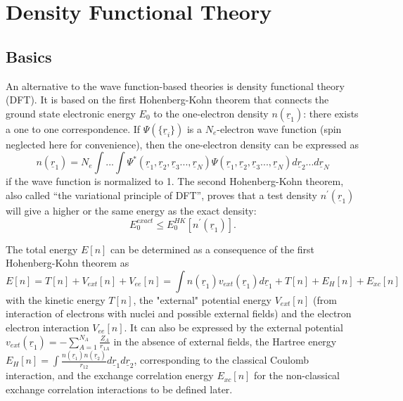 \documentclass[11pt,DIV=13,BCOR=5mm,a4paper,headinclude]{scrbook}
\renewcommand{\vec}[1]{\underline{#1}}
\begin{document}
\section{Density Functional Theory}
\subsection{Basics}
An alternative to the wave function-based theories is density functional theory (DFT).
It is based on the first Hohenberg-Kohn theorem\cite{Hohenberg-Kohn1964} that connects the ground state electronic energy $E_0$ to the one-electron density $n(\vec{r}_1)$: there exists a one to one correspondence.
If $\Psi(\{\vec{r}_i\})$ is a $N_e$-electron wave function (spin neglected here for convenience), then the one-electron density can be expressed as
\begin{equation}\label{eq:electron-density}
 n(\vec{r}_1)=N_e\int ...
\int \Psi^\ast(\vec{r}_1,\vec{r}_2,\vec{r}_3...,\vec{r}_N)\Psi(\vec{r}_1,\vec{r}_2,\vec{r}_3...,\vec{r}_N) d \vec{r}_2...d \vec{r}_N
\end{equation}
if the wave function is normalized to 1.
The second Hohenberg-Kohn theorem, also called ``the variational principle of DFT'', proves that a test density $n^\prime(\vec{r}_1)$ will give a higher or the same energy as the exact density:
\begin{equation}
 E_0^{exact}\leq E_0^{HK}[n^\prime(\vec{r}_1)].
\end{equation}


The total energy $E[n]$ can be determined as a consequence of the first Hohenberg-Kohn theorem as
\begin{equation}
 E[n]=T[n] + V_{ext}[n] + V_{ee}[n]=\int n(\vec{r}_1)v_{ext}(\vec{r}_1)d\vec{r}_1 + T[n]+E_H[n]+E_{xc}[n]
\end{equation}
with the kinetic energy $T[n]$, the "external" potential energy $V_{ext}[n]$ (from interaction of electrons with nuclei and possible external fields) and the electron electron interaction $V_{ee}[n]$.
It can also be expressed by the external potential $v_{ext}(\vec{r}_1)=-\sum_{A=1}^{N_A}\frac{Z_A}{r_{1A}}$ in the absence of external fields, the Hartree energy $E_H[n]=\int\frac{n(\vec{r}_1)n(\vec{r}_2)}{r_{12}}d\vec{r}_1d\vec{r}_2$, corresponding to the classical Coulomb interaction, and the exchange correlation energy $E_{xc}[n]$ for the non-classical exchange correlation interactions to be defined later.
\end{document}
